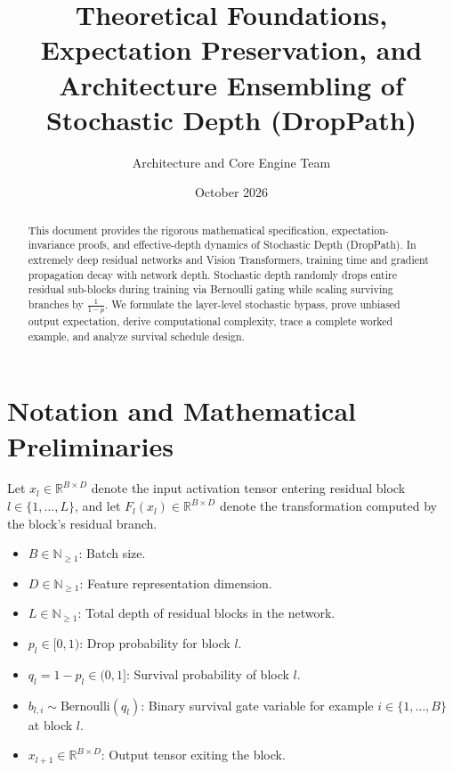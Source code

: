 \documentclass[11pt,a4paper]{article}
\title{\textbf{Theoretical Foundations, Expectation Preservation, and Architecture Ensembling of Stochastic Depth (DropPath)}}
\author{Architecture and Core Engine Team}
\date{October 2026}
\theoremstyle{definition}
\begin{document}
\maketitle

\begin{abstract}
This document provides the rigorous mathematical specification, expectation-invariance proofs, and effective-depth dynamics of Stochastic Depth (DropPath). In extremely deep residual networks and Vision Transformers, training time and gradient propagation decay with network depth. Stochastic depth randomly drops entire residual sub-blocks during training via Bernoulli gating while scaling surviving branches by $\frac{1}{1-p}$. We formulate the layer-level stochastic bypass, prove unbiased output expectation, derive computational complexity, trace a complete worked example, and analyze survival schedule design.
\end{abstract}

\section{Notation and Mathematical Preliminaries}

Let $x_l \in \mathbb{R}^{B \times D}$ denote the input activation tensor entering residual block $l \in \{1, \dots, L\}$, and let $F_l(x_l) \in \mathbb{R}^{B \times D}$ denote the transformation computed by the block's residual branch.

\begin{itemize}
    \item $B \in \mathbb{N}_{\ge 1}$: Batch size.
    \item $D \in \mathbb{N}_{\ge 1}$: Feature representation dimension.
    \item $L \in \mathbb{N}_{\ge 1}$: Total depth of residual blocks in the network.
    \item $p_l \in [0, 1)$: Drop probability for block $l$.
    \item $q_l = 1 - p_l \in (0, 1]$: Survival probability of block $l$.
    \item $b_{l, i} \sim \text{Bernoulli}(q_l)$: Binary survival gate variable for example $i \in \{1, \dots, B\}$ at block $l$.
    \item $x_{l+1} \in \mathbb{R}^{B \times D}$: Output tensor exiting the block.
\end{itemize}
\end{document}
